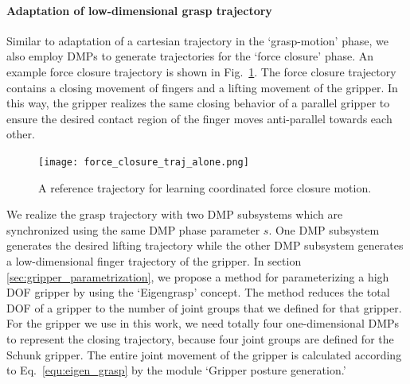 \paragraph*{Adaptation of low-dimensional grasp trajectory} 
Similar to adaptation of a cartesian trajectory in the `grasp-motion' phase, we also employ DMPs to generate trajectories for the `force closure' phase. An example force closure trajectory is shown in Fig.~\ref{fig:force_closure_traj_alone}. The force closure trajectory contains a closing movement of fingers and a lifting movement of the gripper. In this way, the gripper realizes the same closing behavior of a parallel gripper to ensure the desired contact region of the finger moves anti-parallel towards each other. 

\begin{figure}[!htbp]
\centering
\texttt{[image: force\_closure\_traj\_alone.png]}
\captionsetup{justification=raggedright}
\caption{A reference trajectory for learning coordinated force closure motion.}
\label{fig:force_closure_traj_alone}       %
\end{figure}   

We realize the grasp trajectory with two DMP subsystems which are synchronized using the same DMP phase parameter $s$. One DMP subsystem generates the desired lifting trajectory while the other DMP subsystem generates a low-dimensional finger trajectory of the gripper. In section \ref{sec:gripper_parametrization}, we propose a method for parameterizing a high DOF gripper by using the `Eigengrasp' concept. The method reduces the total DOF of a gripper to the number of joint groups that we defined for that gripper.  For the gripper we use in this work, we need totally four one-dimensional DMPs to represent the closing trajectory, because four joint groups are defined for the Schunk gripper. The entire joint movement of the gripper is calculated according to Eq.~\ref{equ:eigen_grasp} by the module `Gripper posture generation.'



